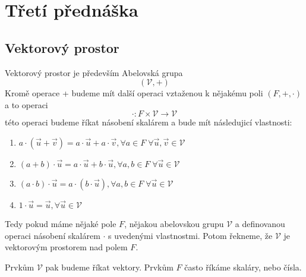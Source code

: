 \section{Třetí přednáška}

\subsection{Vektorový prostor}
\begin{definition}

    Vektorový prostor je především Abelovská grupa
    $$(\mathcal{V}, +)$$
    Kromě operace + budeme mít další operaci vztaženou k nějakému poli $(F, +, \cdot)$
    a to operaci
    $$\cdot: F \times \mathcal{V} \rightarrow \mathcal{V}$$
    této operaci budeme říkat násobení skalárem a bude mít následujicí vlastnosti:
    \begin{enumerate}
        \item $a \cdot (\vec{u} + \vec{v}) = a \cdot \vec{u} + a \cdot \vec{v}, \forall
            a \in F \; \forall \vec{u}, \vec{v} \in \mathcal{V}$
        \item $(a + b) \cdot \vec{u} = a \cdot \vec{u} + b \cdot \vec{u},
            \forall a,b \in F \; \forall \vec{u} \in \mathcal{V}$
        \item $(a \cdot b ) \cdot \vec{u} = a \cdot (b \cdot \vec{u}),
            \forall a,b \in F \; \forall \vec{u} \in \mathcal{V}$
        \item $1 \cdot \vec{u} = \vec{u}, \forall \vec{u} \in \mathcal{V}$
    \end{enumerate}
    Tedy pokud máme nějaké pole $F$, nějakou abelovskou grupu $\mathcal{V}$ a definovanou operaci
    násobení skalárem $\cdot$ s uvedenými vlastnostmi. Potom řekneme, že $\mathcal{V}$ je
    vektorovým prostorem nad polem $F$.

    Prvkům $\mathcal{V}$ pak budeme říkat vektory. Prvkům $F$ často říkáme skaláry,
    nebo čísla.
    \label{def:vector_space}
\end{definition}
